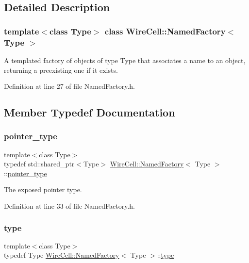 \subsection{Detailed Description}
\subsubsection*{template$<$class Type$>$\newline
class Wire\+Cell\+::\+Named\+Factory$<$ Type $>$}

A templated factory of objects of type Type that associates a name to an object, returning a preexisting one if it exists. 

Definition at line 27 of file Named\+Factory.\+h.



\subsection{Member Typedef Documentation}
\mbox{\label{class_wire_cell_1_1_named_factory_a643f13362219cca5a653ee3c294273ef}} 
\subsubsection{\texorpdfstring{pointer\+\_\+type}{pointer\_type}}
{\footnotesize\ttfamily template$<$class Type$>$ \\
typedef std\+::shared\+\_\+ptr$<$Type$>$ \hyperlink{class_wire_cell_1_1_named_factory}{Wire\+Cell\+::\+Named\+Factory}$<$ Type $>$\+::\hyperlink{class_wire_cell_1_1_named_factory_a643f13362219cca5a653ee3c294273ef}{pointer\+\_\+type}}



The exposed pointer type. 



Definition at line 33 of file Named\+Factory.\+h.

\mbox{\label{class_wire_cell_1_1_named_factory_ace1be935e0fdfcf97cba250e9b7ebfcf}} 
\subsubsection{\texorpdfstring{type}{type}}
{\footnotesize\ttfamily template$<$class Type$>$ \\
typedef Type \hyperlink{class_wire_cell_1_1_named_factory}{Wire\+Cell\+::\+Named\+Factory}$<$ Type $>$\+::\hyperlink{class_wire_cell_1_1_named_factory_ace1be935e0fdfcf97cba250e9b7ebfcf}{type}}



